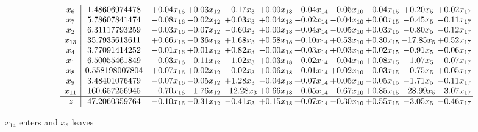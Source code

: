 \documentclass[9pt]{article}
\begin{document}
 \[\begin{array}{c| c c@{\hskip 2pt} c@{\hskip 2pt} c@{\hskip 2pt} c@{\hskip 2pt} c@{\hskip 2pt} c@{\hskip 2pt} c@{\hskip 2pt} c@{\hskip 2pt} c@{\hskip 2pt} }
 x_{6}   &  1.48606974478 & +  0.04 x_{16} & +  0.03 x_{12} & -0.17 x_{3} & +  0.00 x_{18} & +  0.04 x_{14} & -0.05 x_{10} & -0.04 x_{15} & +  0.20 x_{5} & +  0.02 x_{17}\\
 x_{7}   &  5.78607841474 & -0.08 x_{16} & -0.02 x_{12} & +  0.03 x_{3} & +  0.04 x_{18} & -0.02 x_{14} & -0.04 x_{10} & +  0.00 x_{15} & -0.45 x_{5} & -0.11 x_{17}\\
 x_{2}   &  6.31117793259 & -0.03 x_{16} & -0.07 x_{12} & -0.60 x_{3} & +  0.00 x_{18} & -0.04 x_{14} & -0.05 x_{10} & +  0.03 x_{15} & -0.80 x_{5} & -0.12 x_{17}\\
 x_{13}   &  35.7935613611 & +  0.66 x_{16} & -0.36 x_{12} & +  1.68 x_{3} & +  0.58 x_{18} & -0.10 x_{14} & +  0.53 x_{10} & +  0.30 x_{15} & -17.85 x_{5} & +  0.52 x_{17}\\
 x_{4}   &  3.77091414252 & -0.01 x_{16} & +  0.01 x_{12} & +  0.82 x_{3} & -0.00 x_{18} & +  0.03 x_{14} & +  0.03 x_{10} & +  0.02 x_{15} & -0.91 x_{5} & -0.06 x_{17}\\
 x_{1}   &  6.50055461849 & -0.03 x_{16} & -0.11 x_{12} & -1.02 x_{3} & +  0.03 x_{18} & -0.02 x_{14} & -0.04 x_{10} & +  0.08 x_{15} & -1.07 x_{5} & -0.07 x_{17}\\
 x_{8}   &  0.558198007804 & +  0.07 x_{16} & +  0.02 x_{12} & -0.02 x_{3} & +  0.06 x_{18} & -0.01 x_{14} & +  0.02 x_{10} & -0.03 x_{15} & -0.75 x_{5} & +  0.05 x_{17}\\
 x_{9}   &  3.48401076479 & -0.07 x_{16} & -0.05 x_{12} & +  1.28 x_{3} & -0.04 x_{18} & +  0.07 x_{14} & +  0.05 x_{10} & -0.05 x_{15} & -1.71 x_{5} & -0.11 x_{17}\\
 x_{11}   &  160.657256945 & -0.70 x_{16} & -1.76 x_{12} & -12.28 x_{3} & +  0.66 x_{18} & -0.05 x_{14} & -0.67 x_{10} & +  0.85 x_{15} & -28.99 x_{5} & -3.07 x_{17}\\
\hline
z    &  47.2060359764 & -0.10 x_{16} & -0.31 x_{12} & -0.41 x_{3} & +  0.15 x_{18} & +  0.07 x_{14} & -0.30 x_{10} & +  0.55 x_{15} & -3.05 x_{5} & -0.46 x_{17}\\
\end{array}\]


 $ x_{14} $ enters and $ x_{8} $ leaves 
\end{document}
